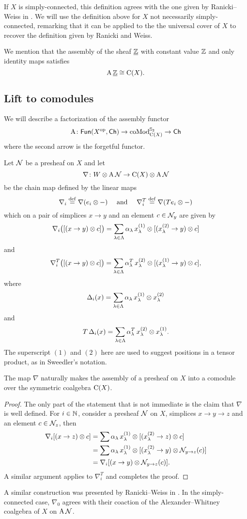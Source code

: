 If $X$ is simply-connected, this definition agrees with the one given by Ranicki--Weiss in \cite[Definition 1.4]{ranicki1990assembly}.
We will use the definition above for $X$ not necessarily simply-connected, remarking that it can be applied to the the universal cover of $X$ to recover the definition given by Ranicki and Weiss.

We mention that the assembly of the sheaf $\underline {\mathbb{Z}}$ with constant value $\mathbb{Z}$ and only identity maps satisfies
\[
\operatorname{A} \underline{\mathbb{Z}} \cong \operatorname{C}(X).
\]

\subsection{Lift to comodules}

We will describe a factorization of the assembly functor
\[
\operatorname{A} \colon \mathsf{Fun}(X^{\mathrm{op}}, \mathsf{Ch}) \to \operatorname{coMod}^{\mathbb{S}_2}_{\operatorname{C}(X)} \to \mathsf{Ch}
\]
where the second arrow is the forgetful functor.

Let $\mathcal{N}$ be a presheaf on $X$ and let
\[
\nabla \colon W \otimes \operatorname{A} \mathcal{N} \to \operatorname{C}(X) \otimes \operatorname{A} \mathcal{N}
\]
be the chain map defined by the linear maps
\[
\nabla_i \stackrel{\mathrm{def}}{=} \nabla(e_i \otimes -)
\quad \text{ and } \quad
\nabla_i^T \stackrel{\mathrm{def}}{=} \nabla(Te_i \otimes -)
\]
which on a pair of simplices $x \to y$ and an element $c \in \mathcal{N}_y$ are given by
\[
\nabla_i \big( [(x \to y) \otimes c] \big) =
\sum_{\lambda \in \Lambda} \alpha_\lambda \, x_\lambda^{(1)} \otimes [(x_\lambda^{(2)} \to y) \otimes c]
\]
and
\[
\nabla_i^T \big( [(x \to y) \otimes c] \big) =
\sum_{\lambda \in \Lambda} \alpha^T_\lambda \, x_\lambda^{(2)} \otimes [(x_\lambda^{(1)} \to y) \otimes c],
\]
where
\[
\operatorname{\Delta}_i(x) = \sum_{\lambda \in \Lambda} \alpha_\lambda \, x_\lambda^{(1)} \otimes x_\lambda^{(2)}
\]
and
\[
T \operatorname{\Delta}_i(x) =
\sum_{\lambda \in \Lambda} \alpha^T_\lambda \, x_\lambda^{(2)} \otimes x_\lambda^{(1)}.
\]
The superscript $(1)$ and $(2)$ here are used to suggest positions in a tensor product, as in Sweedler's notation.

\begin{lemma*}
	The map $\nabla$ naturally makes the assembly of a presheaf on $X$ into a comodule over the symmetric coalgebra $\operatorname{C}(X)$.
\end{lemma*}

\begin{proof}
	The only part of the statement that is not immediate is the claim that $\nabla$ is well defined.
	For $i \in \mathbb{N}$, consider a presheaf $\mathcal{N}$ on $X$, simplices $x \to y \to z$ and an element $c \in \mathcal{N}_z$, then
	\begin{align*}
		\nabla_i [(x \to z) \otimes c] &=
		\sum \alpha_\lambda \, x^{(1)}_\lambda \otimes {[(x^{(2)}_\lambda \to z) \otimes c]} \\ &=
		\sum \alpha_\lambda \, x^{(1)}_\lambda \otimes [(x^{(2)}_\lambda \to y) \otimes \mathcal{N}_{y \to z}(c)] \\ &=
		\nabla_i [(x \to y) \otimes \mathcal{N}_{y \to z}(c)].
	\end{align*}
	A similar argument applies to $\nabla^T_i$ and completes the proof.
\end{proof}

A similar construction was presented by Ranicki--Weiss in \cite[Proposition~5.3]{ranicki1990assembly}.
In the simply-connected case, $\nabla_0$ agrees with their coaction of the Alexander--Whitney coalgebra of $X$ on $\operatorname{A} \mathcal{N}$.